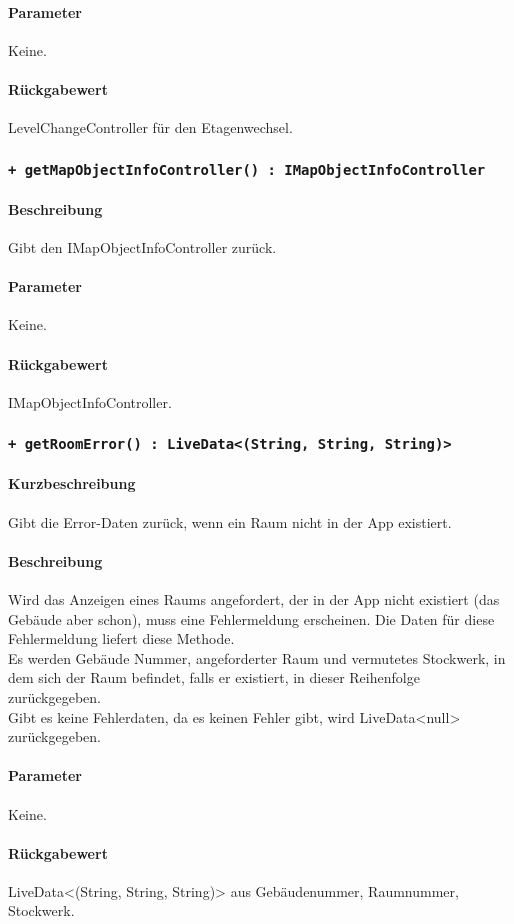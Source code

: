 \paragraph*{Parameter}
Keine.
\paragraph*{Rückgabewert}
LevelChangeController für den Etagenwechsel.

\subsubsection*{\texttt{+ getMapObjectInfoController() : IMapObjectInfoController}}%
\paragraph*{Beschreibung}
Gibt den IMapObjectInfoController zurück.
\paragraph*{Parameter}
Keine.
\paragraph*{Rückgabewert}
IMapObjectInfoController.

\subsubsection*{\texttt{+ getRoomError() : LiveData<(String, String, String)>}}%
\paragraph*{Kurzbeschreibung}
Gibt die Error-Daten zurück, wenn ein Raum nicht in der App existiert.
\paragraph*{Beschreibung}
Wird das Anzeigen eines Raums angefordert, der in der App nicht existiert (das Gebäude aber schon), 
muss eine Fehlermeldung erscheinen. Die Daten für diese Fehlermeldung liefert diese Methode.\\
Es werden Gebäude Nummer, angeforderter Raum und vermutetes Stockwerk, in dem sich der Raum befindet, 
falls er existiert, in dieser Reihenfolge zurückgegeben.\\
Gibt es keine Fehlerdaten, da es keinen Fehler gibt, wird LiveData<null> zurückgegeben.
\paragraph*{Parameter}
Keine.
\paragraph*{Rückgabewert}
LiveData<(String, String, String)> aus Gebäudenummer, Raumnummer, Stockwerk.
